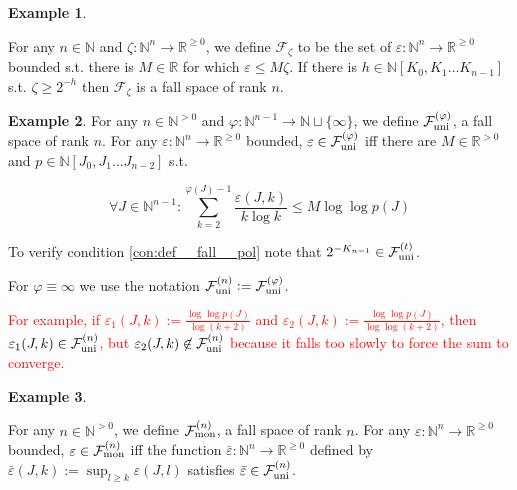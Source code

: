 \documentclass[11pt]{article}
\numberwithin{equation}{section}
\theoremstyle{definition}
\newtheorem{example}{Example}[section]
\theoremstyle{plain}
\newcommand{\Nats}{\mathbb{N}}
\newcommand{\Reals}{\mathbb{R}}
\newcommand{\NatPoly}{\Nats[K_0, K_1 \ldots K_{n-1}]}
\newcommand{\NatPolyJ}{\Nats[J_0, J_1 \ldots J_{n-2}]}
\newcommand{\NatFun}{\Nats^n \rightarrow}
\newcommand{\Fall}{\mathcal{F}}
\newcommand{\FallU}{{\Fall_{\textnormal{uni}}^{(n)}}}
\newcommand{\FallUt}[1]{{\Fall_{\textnormal{uni}}^{(#1)}}}
\newcommand{\FallM}{\Fall_{\textnormal{mon}}^{(n)}}
\begin{document}
\begin{samepage}
\begin{example}
\label{exm:fall_zeta}

For any ${n \in \Nats}$ and ${\zeta: \Nats^n \rightarrow \Reals^{\geq 0}}$, we define ${\Fall_{\zeta}}$ to be the set of ${\varepsilon: \NatFun \Reals^{\geq 0}}$ bounded s.t. there is ${M \in \Reals}$ for which ${\varepsilon \leq M \zeta}$. If there is ${h \in \NatPoly}$ s.t. ${\zeta \geq 2^{-h}}$ then ${\Fall_\zeta}$ is a fall space of rank ${n}$.

\end{example}
\end{samepage}

\begin{samepage}
\begin{example}
\label{exm:e_uni}
For any ${n \in \Nats^{>0}}$ and ${\varphi: \Nats^{n-1} \rightarrow \Nats \sqcup \{ \infty \}}$, we define ${\FallUt{\varphi}}$, a fall space of rank ${n}$. For any ${\varepsilon: \NatFun \Reals^{\geq 0}}$ bounded, $\varepsilon \in \FallUt{\varphi}$ iff there are ${M \in \Reals^{>0}}$ and ${p \in \NatPolyJ}$ s.t.

\begin{equation}
\forall J \in \Nats^{n-1}: \sum_{k=2}^{\varphi(J)-1}\frac{\varepsilon(J,k)}{k \log k} \leq M \log \log p(J)
\end{equation}

To verify condition \ref{con:def__fall__pol} note that ${2^{-K_{n-1}} \in \FallUt{t}}$.

For ${\varphi \equiv \infty}$ we use the notation ${\FallU:=\FallUt{\varphi}}$.

\textcolor{red}{For example, if $\varepsilon_{1}(J,k):=\frac{\log\log p(J)}{\log (k+2)}$ and $\varepsilon_{2}(J,k):=\frac{\log\log p(J)}{\log\log (k+2)}$, then $\varepsilon_{1}(J,k)\in\FallU$, but $\varepsilon_{2}(J,k)\not\in\FallU$ because it falls too slowly to force the sum to converge.}

\end{example}
\end{samepage}

\begin{samepage}
\begin{example}
\label{exm:e_mon}

For any ${n \in \Nats^{>0}}$, we define ${\FallM}$, a fall space of rank ${n}$. For any ${\varepsilon: \NatFun \Reals^{\geq 0}}$ bounded, $\varepsilon \in \FallM$ iff the function ${\bar{\varepsilon}: \NatFun \Reals^{\geq 0}}$ defined by ${\bar{\varepsilon}(J,k):=\sup_{l \geq k} \varepsilon(J,l)}$ satisfies ${\bar{\varepsilon} \in \FallU}$.

\end{example}
\end{samepage}
\end{document}
